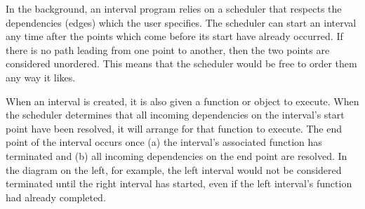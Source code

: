 In the background, an interval program relies on a scheduler that
respects the dependencies (edges) which the user specifies. The
scheduler can start an interval any time after the points which come
before its start have already occurred. If there is no path leading
from one point to another, then the two points are considered
unordered. This means that the scheduler would be free to order them
any way it likes.

When an interval is created, it is also given a function or object to
execute. When the scheduler determines that all incoming dependencies
on the interval's start point have been resolved, it will arrange for
that function to execute. The end point of the interval occurs once
(a) the interval's associated function has terminated and (b) all
incoming dependencies on the end point are resolved. In the diagram
on the left, for example, the left interval would not be considered
terminated until the right interval has started, even if the left
interval's function had already completed.

